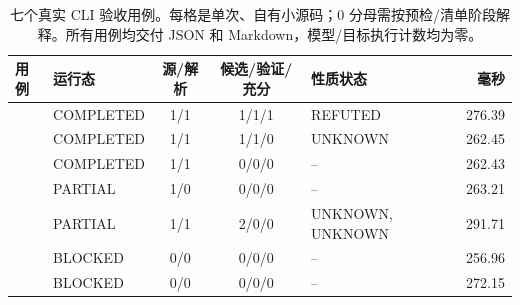 \begin{table}[htbp]\centering\footnotesize
\begin{tabularx}{\textwidth}{Y L{21mm}c c L{25mm}r}
\toprule 用例 & 运行态 & 源/解析 & 候选/验证/充分 & 性质状态 & 毫秒\\\midrule
{} & COMPLETED & 1/1 & 1/1/1 & REFUTED & 276.39\\
 & COMPLETED & 1/1 & 1/1/0 & UNKNOWN & 262.45\\
 & COMPLETED & 1/1 & 0/0/0 & -- & 262.43\\
 & PARTIAL & 1/0 & 0/0/0 & -- & 263.21\\
 & PARTIAL & 1/1 & 2/0/0 & UNKNOWN, UNKNOWN & 291.71\\
 & BLOCKED & 0/0 & 0/0/0 & -- & 256.96\\
 & BLOCKED & 0/0 & 0/0/0 & -- & 272.15\\
\bottomrule\end{tabularx}
\caption{七个真实 CLI 验收用例。每格是单次、自有小源码；0 分母需按预检/清单阶段解释。所有用例均交付 JSON 和 Markdown，模型/目标执行计数均为零。}\label{tab:cli}
\end{table}

